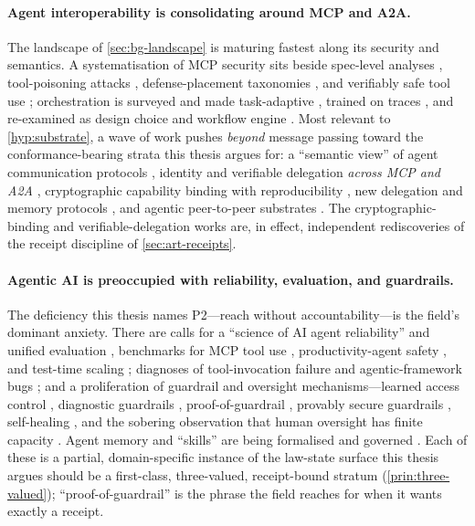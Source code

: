 \paragraph{Agent interoperability is consolidating around MCP and A2A.} The
landscape of \cref{sec:bg-landscape} is maturing fastest along its security and
semantics. A systematisation of MCP security \citep{gaire25} sits beside
spec-level analyses \citep{maloyan26}, tool-poisoning attacks \citep{li26mcpitp,
huang26threat}, defense-placement taxonomies \citep{rostamzadeh26}, and verifiably
safe tool use \citep{doshi26}; orchestration is surveyed \citep{adimulam26} and
made task-adaptive \citep{yu26adaptorch}, trained on traces \citep{zhang26rl}, and
re-examined as design choice \citep{felendler26} and workflow engine
\citep{parmar26}. Most relevant to \cref{hyp:substrate}, a wave of work pushes
\emph{beyond} message passing toward the conformance-bearing strata this thesis
argues for: a ``semantic view'' of agent communication protocols
\citep{yuan26semantic}, identity and verifiable delegation \emph{across MCP and
A2A} \citep{prakash26aip, patil26sentinel, otsuka26}, cryptographic capability
binding with reproducibility \citep{zhou26gov}, new delegation and memory
protocols \citep{nie26, xu26mesh}, and agentic peer-to-peer substrates
\citep{wang26p2p}. The cryptographic-binding and verifiable-delegation works are,
in effect, independent rediscoveries of the receipt discipline of
\cref{sec:art-receipts}.

\paragraph{Agentic AI is preoccupied with reliability, evaluation, and
guardrails.} The deficiency this thesis names P2---reach without
accountability---is the field's dominant anxiety. There are calls for a ``science
of AI agent reliability'' \citep{rabanser26} and unified evaluation
\citep{zhu26eval, souza26, arunkumar26}, benchmarks for MCP tool use
\citep{mcpagentbench25}, productivity-agent safety \citep{li26claws}, and test-time
scaling \citep{li26scaling}; diagnoses of tool-invocation failure
\citep{huang26fail} and agentic-framework bugs \citep{zhang26bug}; and a
proliferation of guardrail and oversight mechanisms---learned access control
\citep{abaev26}, diagnostic guardrails \citep{liu26dog}, proof-of-guardrail
\citep{jin26guardrail}, provably secure guardrails \citep{wu26guardrail},
self-healing \citep{jeong26}, and the sobering observation that human oversight
has finite capacity \citep{turan26}. Agent memory and ``skills'' are being
formalised and governed \citep{du26memory, lam26memory, xu26skills, zhou26ext}.
Each of these is a partial, domain-specific instance of the law-state surface this
thesis argues should be a first-class, three-valued, receipt-bound stratum
(\cref{prin:three-valued}); ``proof-of-guardrail'' \citep{jin26guardrail} is the
phrase the field reaches for when it wants exactly a receipt.

